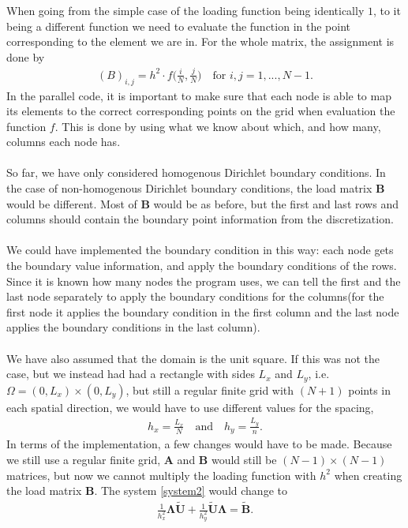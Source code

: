 When going from the simple case of the loading function being identically $1$, to it being a different function we need to evaluate the function in the point corresponding to the element we are in. For the whole matrix, the assignment is done by
\begin{align*}
	(B)_{i,j} = h^2\cdot f\Big(\frac{i}{N},\frac{j}{N}\Big) \quad \text{for } i,j = 1,...,N-1.
\end{align*}
In the parallel code, it is important to make sure that each node is able to map its elements to the correct corresponding points on the grid when evaluation the function $f$. This is done by using what we know about which, and how many, columns each node has.
\\
\\
So far, we have only considered homogenous Dirichlet boundary conditions. In the case of non-homogenous Dirichlet boundary conditions, the load matrix $\mathbf{B}$ would be different. Most of $\mathbf{B}$ would be as before, but the first and last rows and columns should contain the boundary point information from the discretization. \\
\\
We could have implemented the boundary condition in this way: each node gets the boundary value information, and apply the boundary conditions of the rows. Since it is known how many nodes the program uses, we can tell the first and the last node separately to apply the boundary conditions for the columns(for the first node it applies the boundary condition in the first column and the last node applies the boundary conditions in the last column).
\\
\\
We have also assumed that the domain is the unit square. If this was not the case, but we instead had had a rectangle with sides $L_x$ and $L_y$, i.e. $ \Omega = (0,L_x)\times (0,L_y)$, but still a regular finite grid with $(N+1)$ points in each spatial direction, we would have to use different values for the spacing, 
\begin{align*}
	h_x = \frac{L_x}{N} \quad \text{and} \quad h_y = \frac{L_y}{n}.
\end{align*}
In terms of the implementation, a few changes would have to be made. Because we still use a regular finite grid, $\mathbf{A}$ and $\mathbf{B}$ would still be $(N-1)\times (N-1)$ matrices, but now we cannot multiply the loading function with $h^2$ when creating the load matrix $\mathbf{B}$. The system \eqref{system2} would change to 
\begin{align*}
	\frac{1}{h_x^2}\mathbf{\Lambda\widetilde{U}} + \frac{1}{h_y^2}\mathbf{\widetilde{U}\Lambda} = \mathbf{\widetilde{B}}.
\end{align*}

